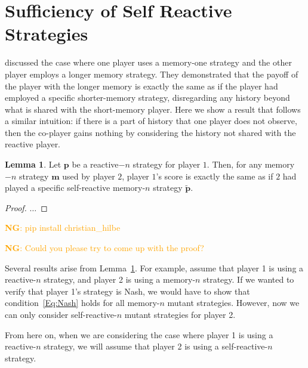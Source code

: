 \documentclass{article}
\newcommand{\nikoleta}[1]{\textcolor{orange}{\textbf{NG}: #1}}
\theoremstyle{definition}
\newtheorem{lemma}[theorem]{Lemma}
\begin{document}

\section{Sufficiency of Self Reactive Strategies}\label{section:self_reactive_sufficiency}


\cite{press:PNAS:2012} discussed the case where one player uses a memory-one
strategy and the other player employs a longer memory strategy. They
demonstrated that the payoff of the player with the longer memory is exactly the
same as if the player had employed a specific shorter-memory strategy,
disregarding any history beyond what is shared with the short-memory player.
Here we show a result that follows a similar intuition: if there is a part of
history that one player does not observe, then the co-player gains nothing by
considering the history not shared with the reactive player.

\begin{lemma}\label{lemma:self_reactive_sufficiency}
  Let $\mathbf{p}$ be a reactive$-n$ strategy for player $1$. Then, for any
  memory$-n$ strategy $\mathbf{m}$ used by player $2$, player $1$'s score is
  exactly the same as if $2$ had played a specific self-reactive memory-$n$
  strategy $\mathbf{\tilde{p}}$.
\end{lemma}

\begin{proof}
$\dots$
\end{proof}

\nikoleta{pip install christian\_hilbe}

\nikoleta{Could you please try to come up with the proof?}

Several results arise from Lemma~\ref{lemma:self_reactive_sufficiency}. For
example, assume that player 1 is using a reactive-$n$ strategy, and player 2 is
using a memory-$n$ strategy. If we wanted to verify that player 1's strategy is
Nash, we would have to show that condition~\eqref{Eq:Nash} holds for all
memory-$n$ mutant strategies. However, now we can only consider
self-reactive-$n$ mutant strategies for player 2.

From here on, when we are considering the case where player 1 is using a
reactive-$n$ strategy, we will assume that player 2 is using a self-reactive-$n$
strategy.
\end{document}
